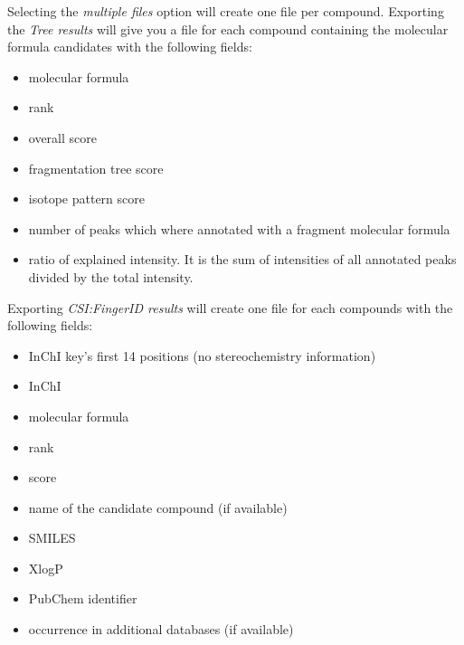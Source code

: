 \documentclass[letterpaper,10pt,openany,oneside]{sphinxmanual}
\newcommand{\todo}[1]{}
\newcommand\gui[1]{\textsl{\guilsinglleft#1\guilsinglright\xspace}}
\begin{document}
Selecting the \gui{multiple files} option will create one file per compound. Exporting the \gui{Tree results} will give you a  file for each compound containing the molecular formula candidates with the following fields: 
\begin{itemize}
\item molecular formula
\item rank
\item overall score
\item fragmentation tree score
\item isotope pattern score
\item number of peaks which where annotated with a fragment molecular formula
\item ratio of explained intensity. It is the sum of intensities of all annotated peaks divided by the total intensity.
\end{itemize}
Exporting \gui{CSI:FingerID results} will create one  file for each compounds with the following fields:
\begin{itemize}
\item InChI key's first 14 positions (no stereochemistry information)
\item InChI
\item molecular formula
\item rank
\item score
\item name of the candidate compound (if available)
\item SMILES 
\item XlogP
\item PubChem identifier
\item occurrence in additional databases (if available)
\end{itemize}


\todo{Workspace and CLI output same format as .sirius?}


%
%
\end{document}
